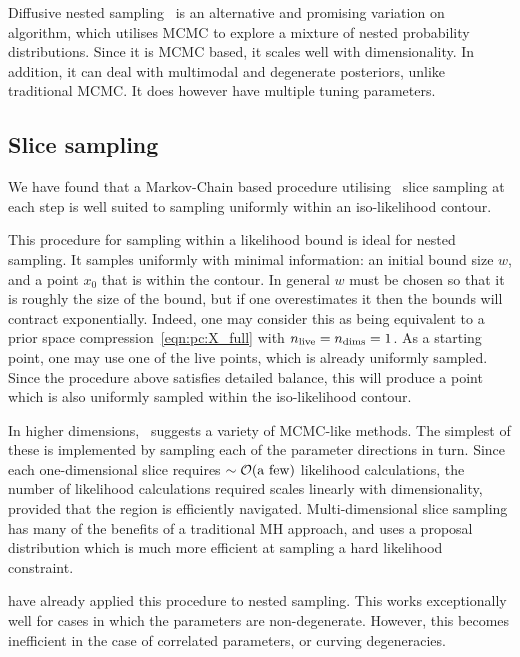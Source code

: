 Diffusive nested sampling~\citep{DiffusiveNestedSampling} is an alternative and promising variation on~ algorithm, which utilises MCMC to explore a mixture of nested probability distributions. Since it is MCMC based, it scales well with dimensionality. In addition, it can deal with multimodal and degenerate posteriors, unlike traditional MCMC\@. It does however have multiple tuning parameters.


\subsection{Slice sampling}
\label{sec:bay:slice_sampling}
We have found that a Markov-Chain based procedure utilising~ slice sampling at each step is well suited to sampling uniformly within an iso-likelihood contour.

This procedure for sampling within a likelihood bound is ideal for nested sampling. It samples uniformly with minimal information: an initial bound size \(w\), and a point \(x_0\) that is within the contour. In general \(w\) must be chosen so that it is roughly the size of the bound, but if one overestimates it then the bounds will contract exponentially. Indeed, one may consider this as being equivalent to a prior space compression~\eqref{eqn:pc:X_full} with \(n_{\mathrm{live}}=n_{\mathrm{dims}}=1\). As a starting point, one may use one of the live points, which is already uniformly sampled. Since the procedure above satisfies detailed balance, this will produce a point which is also uniformly sampled within the iso-likelihood contour.

In higher dimensions,~\cite{NealSlice} suggests a variety of MCMC-like methods. The simplest of these is implemented by sampling each of the parameter directions in turn. Since each one-dimensional slice requires \({\sim\mathcal{O}{\left(\text{a few}\right)}}\) likelihood calculations, the number of likelihood calculations required scales linearly with dimensionality, provided that the region is efficiently navigated. Multi-dimensional slice sampling has many of the benefits of a traditional MH approach, and uses a proposal distribution which is much more efficient at sampling a hard likelihood constraint.

\cite{SystemsBio} have already applied this procedure to nested sampling. This works exceptionally well for cases in which the parameters are non-degenerate. However, this becomes inefficient in the case of correlated parameters, or curving degeneracies.





